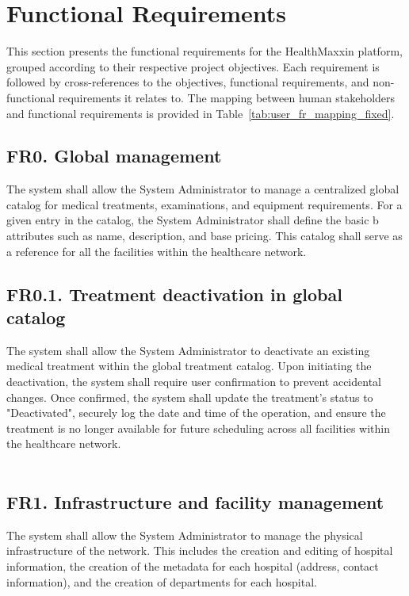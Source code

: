 \documentclass[12pt, a4paper]{article}
\begin{document}
\newpage

\section{Functional Requirements}
This section presents the functional requirements for the HealthMaxxin platform, grouped according to their respective project objectives. Each requirement is followed by cross-references to the objectives, functional requirements, and non-functional requirements it relates to. The mapping between human stakeholders and functional requirements is provided in Table~\ref{tab:user_fr_mapping_fixed}.
\subsection{FR0. Global management} \label{FR0}
The system shall allow the System Administrator to manage a centralized global catalog for medical treatments, examinations, and equipment requirements. For a given entry in the catalog, the System Administrator shall define the basic b attributes such as name, description, and base pricing. This catalog shall serve as a reference for all the facilities within the healthcare network.
\\ 

\subsection{FR0.1. Treatment deactivation in global catalog} \label{FR0.1}
The system shall allow the System Administrator to deactivate an existing medical treatment within the global treatment catalog. Upon initiating the deactivation, the system shall require user confirmation to prevent accidental changes. Once confirmed, the system shall update the treatment's status to "Deactivated", securely log the date and time of the operation, and ensure the treatment is no longer available for future scheduling across all facilities within the healthcare network.
\\ 
\\ 

\subsection{FR1. Infrastructure and facility management} \label{FR1}
The system shall allow the System Administrator to manage the physical infrastructure of the network. This includes the creation and editing of hospital information, the creation of the metadata for each hospital (address, contact information), and the creation of departments for each hospital.
\\ 
\end{document}
